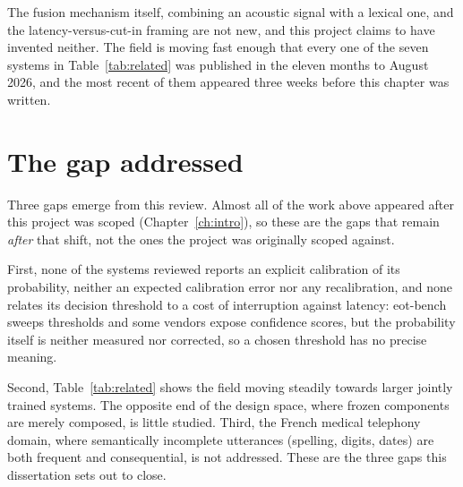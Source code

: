 The fusion mechanism itself, combining an acoustic signal with a lexical one, and the
latency-versus-cut-in framing are not new, and this project claims to have invented
neither. The field is moving fast enough that every one
of the seven systems in Table~\ref{tab:related} was published in the eleven months to
August 2026, and the most recent of them appeared three weeks before this chapter was
written.

\section{The gap addressed}
\label{sec:gap}

Three gaps emerge from this review. Almost all of the work above appeared after this
project was scoped (Chapter~\ref{ch:intro}), so these are the gaps that remain \emph{after}
that shift, not the ones the project was originally scoped against.

First, none of the systems reviewed reports an explicit
calibration of its probability, neither an expected calibration error nor any
recalibration, and none relates its decision threshold to a cost of interruption against
latency: eot-bench sweeps thresholds and some vendors expose confidence scores, but the
probability itself is neither measured nor corrected, so a chosen threshold has no precise
meaning. 

Second, Table~\ref{tab:related} shows the field moving steadily towards larger jointly
trained systems. The opposite end of the design space, where frozen components are merely
composed, is little studied.
Third, the French medical telephony domain, where semantically incomplete utterances
(spelling, digits, dates) are both frequent and consequential, is not addressed. These
are the three gaps this dissertation sets out to close.

